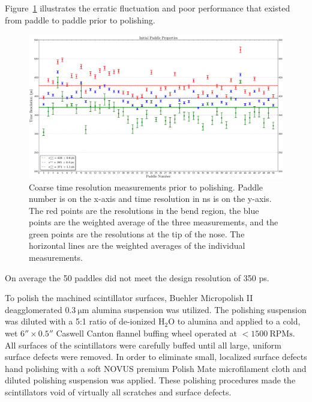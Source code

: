 Figure~\ref{fig:Initial_Paddle_Prop_UW} illustrates the erratic fluctuation and poor performance that existed from paddle to paddle prior to polishing. 
\begin{figure}[!htb]
	\centering
	\includegraphics[width=1.0\columnwidth]{fabrication/figs/Initial_Paddle_Prop_UW}
	\caption[Coarse time resolution measurements prior to polishing]{Coarse time resolution measurements prior to polishing. Paddle number is on the x-axis and time resolution in ns is on the y-axis. The red points are the resolutions in the bend region, the blue points are the weighted average of the three measurements, and the green points are the resolutions at the tip of the nose.  The horizontal lines are the weighted averages of the individual measurements.}
	\label{fig:Initial_Paddle_Prop_UW}
\end{figure}
On average the 50 paddles did not meet the design resolution of 350 ps.

To polish the machined scintillator surfaces, Buehler Micropolish II deagglomerated $\mathrm{0.3\ \mu m}$ alumina suspension was utilized\cite{buehler}.  The polishing suspension was diluted with a 5:1 ratio of de-ionized $\mathrm{H_{2}O}$ to alumina and applied to a cold, wet $6'' \times 0.5''$ Caswell Canton flannel buffing wheel\cite{caswell} operated at $\mathrm{<1500~RPMs}$. All surfaces of the scintillators were carefully buffed until all large, uniform surface defects were removed. In order to eliminate small, localized surface defects hand polishing with a soft NOVUS premium Polish Mate microfilament cloth\cite{novus} and diluted polishing suspension was applied.  These polishing procedures made the scintillators void of virtually all scratches and surface defects.

